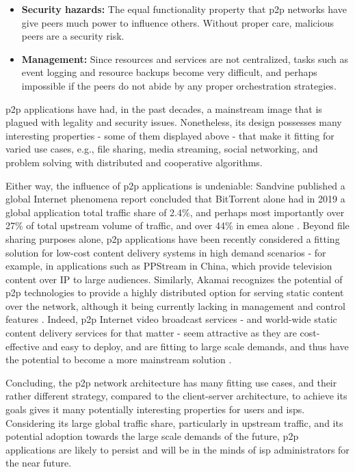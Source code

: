 \begin{itemize}
    \item \textbf{Security hazards:} The equal functionality property that \gls{p2p} networks have give peers much power to influence others.
        Without proper care, malicious peers are a security risk.
    \item \textbf{Management:} Since resources and services are not centralized, tasks such as event logging and resource backups become very difficult, and perhaps impossible if the peers do not abide by any proper orchestration strategies.
\end{itemize}

    \gls{p2p} applications have had, in the past decades, a mainstream image that is plagued with legality and security issues.
    Nonetheless, its design possesses many interesting properties - some of them displayed above - that make it fitting for varied use cases, e.g., file sharing, media streaming, social networking, and problem solving with distributed and cooperative algorithms.

    Either way, the influence of \gls{p2p} applications is undeniable: Sandvine \cite{sandvine} published a global Internet phenomena report concluded that BitTorrent \cite{bittorrent} alone had in 2019 a global application total traffic share of 2.4\%, and perhaps most importantly over 27\% of total upstream volume of traffic, and over 44\% in \gls{emea} alone \cite{sandvine2019}.
    Beyond file sharing purposes alone, \gls{p2p} applications have been recently considered a fitting solution for low-cost content delivery systems in high demand scenarios - for example, in applications such as PPStream \cite{ppstream} in China, which provide television content over IP to large audiences.
    Similarly, Akamai \cite{akamai} recognizes the potential of \gls{p2p} technologies to provide a highly distributed option for serving static content over the network, although it being currently lacking in management and control features \cite{akamai-report}.
    Indeed, \gls{p2p} Internet video broadcast services - and world-wide static content delivery services for that matter - seem attractive as they are cost-effective and easy to deploy, and are fitting to large scale demands, and thus have the potential to become a more mainstream solution \cite{jiangchuanliu2008}.

    Concluding, the \gls{p2p} network architecture has many fitting use cases, and their rather different strategy, compared to the client-server architecture, to achieve its goals gives it many potentially interesting properties for users and \glspl{isp}.
    Considering its large global traffic share, particularly in upstream traffic, and its potential adoption towards the large scale demands of the future, \gls{p2p} applications are likely to persist and will be in the minds of \gls{isp} administrators for the near future.

